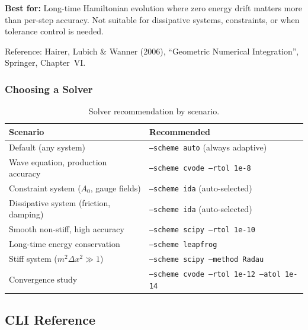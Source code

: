 \textbf{Best for:} Long-time Hamiltonian evolution where zero energy drift
matters more than per-step accuracy. Not suitable for dissipative systems,
constraints, or when tolerance control is needed.

Reference: Hairer, Lubich \& Wanner (2006), ``Geometric Numerical
Integration'', Springer, Chapter~VI.

\subsubsection{Choosing a Solver}
\label{sec:choosing-solver}

\begin{table}[htbp]
\centering
\caption{Solver recommendation by scenario.}
\label{tab:solver-recommendation}
\begin{tabular}{@{}ll@{}}
\toprule
Scenario & Recommended \\
\midrule
Default (any system) & \texttt{--scheme auto} (always adaptive) \\
Wave equation, production accuracy & \texttt{--scheme cvode --rtol 1e-8} \\
Constraint system ($A_0$, gauge fields) & \texttt{--scheme ida} (auto-selected) \\
Dissipative system (friction, damping) & \texttt{--scheme ida} (auto-selected) \\
Smooth non-stiff, high accuracy & \texttt{--scheme scipy --rtol 1e-10} \\
Long-time energy conservation & \texttt{--scheme leapfrog} \\
Stiff system ($m^2 \Delta x^2 \gg 1$) & \texttt{--scheme scipy --method Radau} \\
Convergence study & \texttt{--scheme cvode --rtol 1e-12 --atol 1e-14} \\
\bottomrule
\end{tabular}
\end{table}

\subsection{CLI Reference}
\label{sec:adaptive-timestepping-cli}

